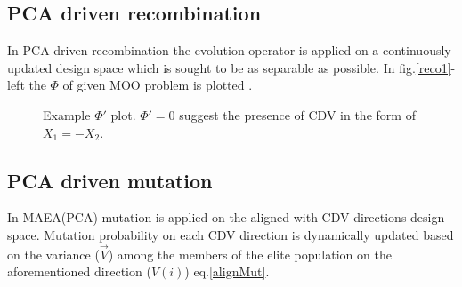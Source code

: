 \paragraph{}
\subsection{PCA driven recombination}
In PCA driven recombination the evolution operator is applied on a continuously updated design space which is sought to be as separable as possible. In fig.\ref{reco1}-left the $\Phi$ of given MOO problem is plotted .    

\begin{figure}[h!]
\begin{minipage}[b]{0.5\linewidth}
 \centering
\end{minipage}
\begin{minipage}[b]{0.5\linewidth}
 \centering
\end{minipage}
\caption{Example $\Phi'$ plot. $\Phi' = 0$ suggest the presence of CDV in the form of $X_1=-X_2$.} 
\label{reco2}
\end{figure}
\pagebreak


\subsection{PCA driven mutation}
In MAEA(PCA) mutation is applied on the aligned with CDV directions design space. Mutation probability on each CDV direction is dynamically updated based on the variance ($\vec{V}$) among the members of the elite population on the aforementioned direction ($V(i)$) eq.\ref{alignMut}.    

